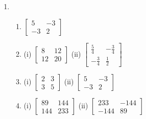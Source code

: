 \documentclass[12pt]{article}
\begin{document}
\bigskip


\begin{enumerate}
\item
\begin{enumerate}\item$ \left[ {\begin{array}{rr}5&-3\\-3&2 \end{array}}
\right]$\\
\item(i) $\left[ {\begin{array}{rr}8&12\\12&20\end{array}}
 \right]$\quad
(ii) $\left[ {\begin{array}{rr} \frac {5}{4}  & -\frac {3}{4}\\ -\frac {3}{4}  & \frac {1}{2}
\end{array}} \right]$
\item (i) $\left[ {\begin{array}{rr} 2 & 3 \\ 3 & 5 \end{array}}
\right]$ \quad (ii) $\left[ {\begin{array}{rr} 5 & -3 \\ -3 &
2\end{array}} \right]$
\item (i) $\left[ {\begin{array}{rr} 89 &
144
\\ 144 & 233
\end{array}}
 \right]$\quad
(ii) $
 \left[
{\begin{array}{rr}
233 & -144 \\
-144 & 89
\end{array}}
 \right]$
 \end{enumerate}


\end{enumerate}
\end{document}

